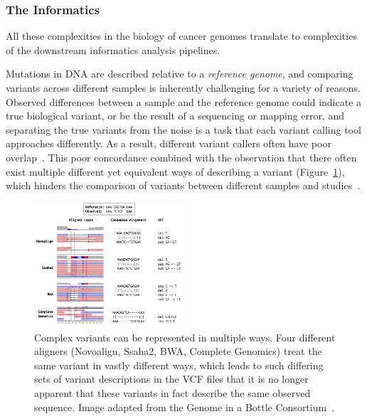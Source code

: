 \begin{justify}

\subsubsection{The Informatics}

All these complexities in the biology of cancer genomes translate to complexities of the downstream informatics analysis pipelines.

Mutations in DNA are described relative to a \emph{reference genome}, and comparing variants across different samples is inherently challenging for a variety of reasons. Observed differences between a sample and the reference genome could indicate a true biological variant, or be the result of a sequencing or mapping error, and separating the true variants from the noise is a task that each variant calling tool approaches differently. As a result, different variant callers often have poor overlap~\cite{orawe2013, hwang2015systematic}. This poor concordance combined with the observation that there often exist multiple different yet equivalent ways of describing a variant (Figure~\ref{fig:variant-multiple-representations}), which hinders the comparison of variants between different samples and studies~\cite{zook2014integrating}.

\begin{figure}[h!]
    \centering
    \includegraphics[width=0.5\textwidth]{chapters/images/variant-representation-all.png}

    \caption{Complex variants can be represented in multiple ways. Four different aligners (Novoalign, Ssaha2, BWA, Complete Genomics) treat the same variant in vastly different ways, which leads to such differing sets of variant descriptions in the VCF files that it is no longer apparent that these variants in fact describe the same observed sequence. Image adapted from the Genome in a Bottle Consortium~\cite{zook2014integrating}.}
    \label{fig:variant-multiple-representations}
\end{figure}



\end{justify}
